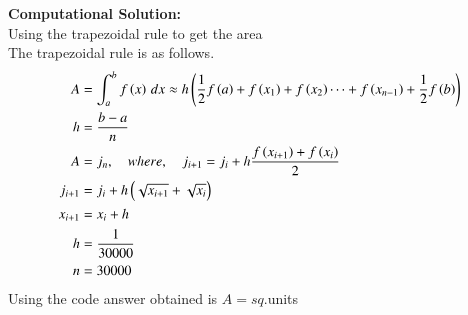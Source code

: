 \documentclass[journal]{IEEEtran}
\begin{document}
\textbf{Computational Solution:}\\
Using the trapezoidal rule to get the area\\
The trapezoidal rule is as follows.\\
\begin{align}
    A &= \int_a^b f\left(x\right)\,dx\approx h\left(\frac{1}{2}f\left(a\right)+f\left(x_1\right)+f\left(x_2\right)\dots+f\left(x_{n-1}\right)+\frac{1}{2}f\left(b\right)\right)\\
    h&=\frac{b-a}{n}\\
    A &= j_n,\quad where ,\quad j_{i+1}=j_i +h\frac{f\left(x_{i+1}\right)+f\left(x_i\right)}{2}\\
    j_{i+1}&= j_i+h\left(\sqrt{x_{i+1}}+\sqrt{x_i}\right)\\
    x_{i+1}&=x_i +h\\
    h&=\frac{1}{30000}\\
    n&=30000
\end{align}
Using the code answer obtained is $A=sq$.units 
\end{document}
